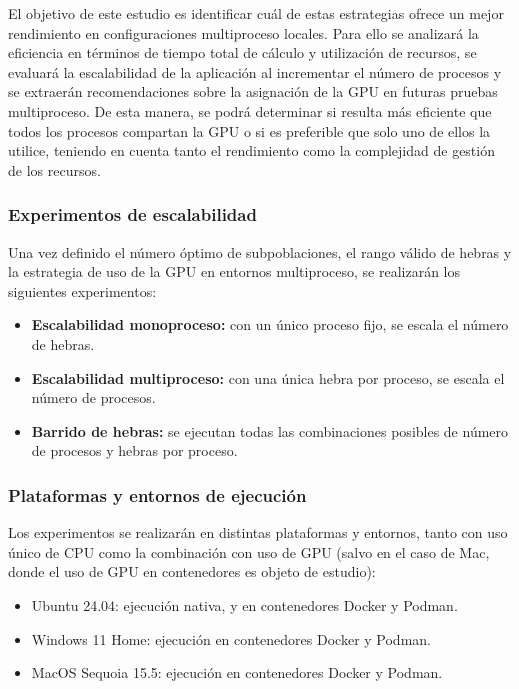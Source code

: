 El objetivo de este estudio es identificar cuál de estas estrategias ofrece un mejor rendimiento en configuraciones multiproceso locales. Para ello se analizará la eficiencia en términos de tiempo total de cálculo y utilización de recursos, se evaluará la escalabilidad de la aplicación al incrementar el número de procesos y se extraerán recomendaciones sobre la asignación de la GPU en futuras pruebas multiproceso. De esta manera, se podrá determinar si resulta más eficiente que todos los procesos compartan la GPU o si es preferible que solo uno de ellos la utilice, teniendo en cuenta tanto el rendimiento como la complejidad de gestión de los recursos.

\subsubsection{Experimentos de escalabilidad}

Una vez definido el número óptimo de subpoblaciones, el rango válido de hebras y la estrategia de uso de la GPU en entornos multiproceso, se realizarán los siguientes experimentos:

\begin{itemize}
    \item \textbf{Escalabilidad monoproceso:} con un único proceso fijo, se escala el número de hebras.
    \item \textbf{Escalabilidad multiproceso:} con una única hebra por proceso, se escala el número de procesos.
    \item \textbf{Barrido de hebras:} se ejecutan todas las combinaciones posibles de número de procesos y hebras por proceso.
\end{itemize}

\subsubsection{Plataformas y entornos de ejecución}

Los experimentos se realizarán en distintas plataformas y entornos, tanto con uso único de CPU como la combinación con uso de GPU (salvo en el caso de Mac, donde el uso de GPU en contenedores es objeto de estudio):

\begin{itemize}
    \item Ubuntu 24.04: ejecución nativa, y en contenedores Docker y Podman.
    \item Windows 11 Home: ejecución en contenedores Docker y Podman.
    \item MacOS Sequoia 15.5: ejecución en contenedores Docker y Podman.
\end{itemize}

